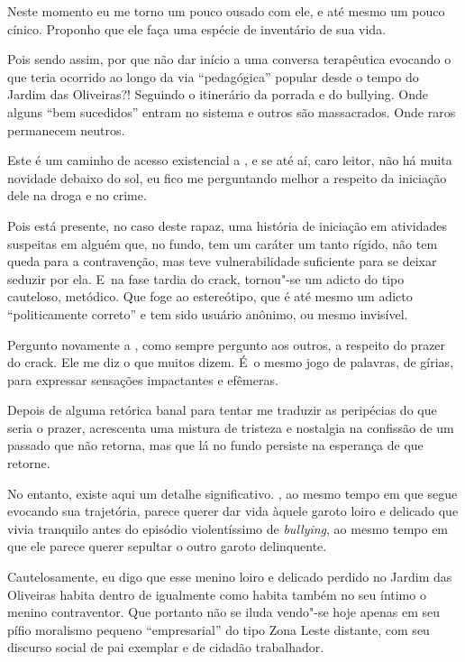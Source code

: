 Neste momento eu me torno um pouco ousado com ele, e até mesmo um pouco
cínico. Proponho que ele faça uma espécie de inventário de sua vida.

Pois sendo assim, por que não dar início a uma conversa terapêutica
evocando o que teria ocorrido ao longo da via ``pedagógica'' popular
desde o tempo do Jardim das Oliveiras?! Seguindo o itinerário da porrada
e do bullying. Onde alguns ``bem sucedidos'' entram no sistema e outros
são massacrados. Onde raros permanecem neutros.

Este é um caminho de acesso existencial a , e se até aí, caro leitor,
não há muita novidade debaixo do sol, eu fico me perguntando melhor a
respeito da iniciação dele na droga e no crime.

Pois está presente, no caso deste rapaz, uma história de iniciação em
atividades suspeitas em alguém que, no fundo, tem um caráter um tanto
rígido, não tem queda para a contravenção, mas teve vulnerabilidade
suficiente para se deixar seduzir por ela. E~na fase tardia do crack, 
tornou"-se um adicto do tipo cauteloso, metódico. Que foge ao
estereótipo, que é até mesmo um adicto ``politicamente correto'' e tem
sido usuário anônimo, ou mesmo invisível.

Pergunto novamente a , como sempre pergunto aos outros, a respeito do
prazer do crack. Ele me diz o que muitos dizem. É~o mesmo jogo de
palavras, de gírias, para expressar sensações impactantes e efêmeras.

Depois de alguma retórica banal para tentar me traduzir as peripécias do
que seria o prazer,  acrescenta uma mistura de tristeza e nostalgia na
confissão de um passado que não retorna, mas que lá no fundo persiste na
esperança de que retorne.

No entanto, existe aqui um detalhe significativo. , ao mesmo tempo em
que segue evocando sua trajetória, parece querer dar vida àquele garoto
loiro e delicado que vivia tranquilo antes do episódio violentíssimo de
\emph{bullying}, ao mesmo tempo em que ele parece querer sepultar o
outro garoto  delinquente.

Cautelosamente, eu digo que esse menino loiro e delicado perdido no
Jardim das Oliveiras habita dentro de  igualmente como habita também
no seu íntimo o menino contraventor. Que  portanto não se iluda
vendo"-se hoje apenas em seu pífio moralismo pequeno ``empresarial'' do
tipo Zona Leste distante, com seu discurso social de pai exemplar e de
cidadão trabalhador.


